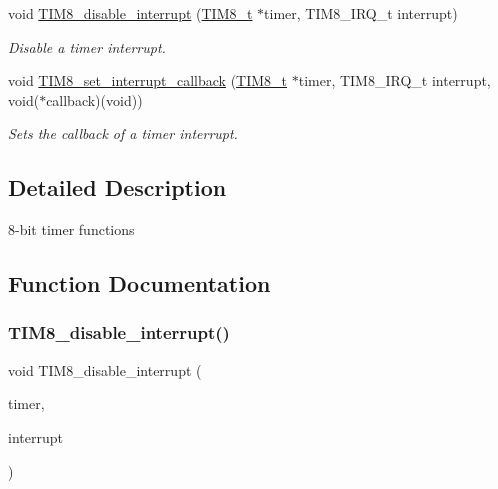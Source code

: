 \begin{DoxyCompactItemize}
void \mbox{\hyperlink{group___t_i_m8_gaa221cfea45d9cd86e0575b5d542320df}{T\+I\+M8\+\_\+disable\+\_\+interrupt}} (\mbox{\hyperlink{struct_t_i_m8__t}{T\+I\+M8\+\_\+t}} $\ast$timer, T\+I\+M8\+\_\+\+I\+R\+Q\+\_\+t interrupt)
\begin{DoxyCompactList}\small\item\em Disable a timer interrupt. \end{DoxyCompactList}\item 
void \mbox{\hyperlink{group___t_i_m8_ga4d02eb0947a9db36b7371e79488d4880}{T\+I\+M8\+\_\+set\+\_\+interrupt\+\_\+callback}} (\mbox{\hyperlink{struct_t_i_m8__t}{T\+I\+M8\+\_\+t}} $\ast$timer, T\+I\+M8\+\_\+\+I\+R\+Q\+\_\+t interrupt, void($\ast$callback)(void))
\begin{DoxyCompactList}\small\item\em Sets the callback of a timer interrupt. \end{DoxyCompactList}\end{DoxyCompactItemize}


\subsection{Detailed Description}
8-\/bit timer functions 



\subsection{Function Documentation}
\mbox{\label{group___t_i_m8_gaa221cfea45d9cd86e0575b5d542320df}} 
\subsubsection{\texorpdfstring{T\+I\+M8\+\_\+disable\+\_\+interrupt()}{TIM8\_disable\_interrupt()}}
{\footnotesize\ttfamily void T\+I\+M8\+\_\+disable\+\_\+interrupt (\begin{DoxyParamCaption}\item[{\mbox{\hyperlink{struct_t_i_m8__t}{T\+I\+M8\+\_\+t}} $\ast$}]{timer,  }\item[{T\+I\+M8\+\_\+\+I\+R\+Q\+\_\+t}]{interrupt }\end{DoxyParamCaption})}



